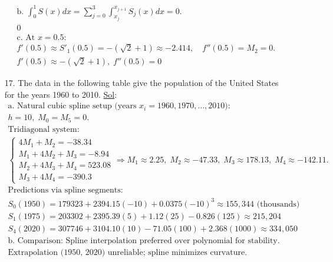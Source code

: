 \begin{enumerate}
\[\begin{array}{l}
        \text{b. } \int_0^1 S(x)dx = \sum_{j=0}^3
        \int_{x_j}^{x_{j+1}} S_j(x)dx = 0. \\[6pt]
        \boxed{0} \\[12pt]

        \text{c. At } x = 0.5: \\
        f'(0.5) \approx S'_1(0.5) = -(\sqrt{2} + 1) \approx
        -2.414,\quad f''(0.5) = M_2 = 0. \\[6pt]
        \boxed{f'(0.5) \approx -(\sqrt{2} + 1),\; f''(0.5) = 0}
      \end{array}
    \]

  \item[17.] The data in the following table give the population of
    the United States for the years 1960 to 2010.
      \underline{Sol}:\\

\[
\begin{array}{l}
   \text{a. Natural cubic spline setup (years } x_i = 1960, 1970, \dots, 2010\text{):} \\
   h = 10,\; M_0 = M_5 = 0. \\
   \text{Tridiagonal system:} \\
   \begin{cases} 
   4M_1 + M_2 = -38.34 \\
   M_1 + 4M_2 + M_3 = -8.94 \\
   M_2 + 4M_3 + M_4 = 523.08 \\
   M_3 + 4M_4 = -390.3 
   \end{cases} \Rightarrow M_1 \approx 2.25,\; M_2 \approx -47.33,\; M_3 \approx 178.13,\; M_4 \approx -142.11. \\[6pt]
   \text{Predictions via spline segments:} \\
   S_0(1950) = 179323 + 2394.15(-10) + 0.0375(-10)^3 \approx \boxed{155,\!344} \text{ (thousands)} \\
   S_1(1975) = 203302 + 2395.39(5) + 1.12(25) - 0.826(125) \approx \boxed{215,\!204} \\
   S_4(2020) = 307746 + 3104.10(10) - 71.05(100) + 2.368(1000) \approx \boxed{334,\!050} \\[12pt]
   
   \text{b. Comparison: Spline interpolation preferred over polynomial for stability.} \\
   \text{Extrapolation (1950, 2020) unreliable; spline minimizes curvature.}
\end{array}
\]
\end{enumerate}
